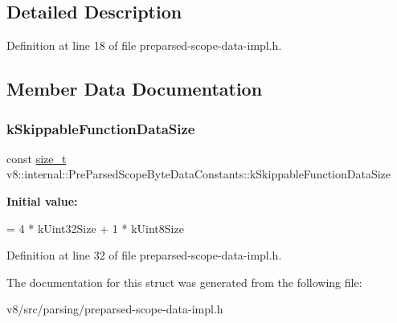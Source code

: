 \subsection{Detailed Description}


Definition at line 18 of file preparsed-\/scope-\/data-\/impl.\+h.



\subsection{Member Data Documentation}
\mbox{\label{structv8_1_1internal_1_1PreParsedScopeByteDataConstants_a93fc214dfdc6add166b5854c65a90c49}} 
\subsubsection{\texorpdfstring{k\+Skippable\+Function\+Data\+Size}{kSkippableFunctionDataSize}}
{\footnotesize\ttfamily const \mbox{\hyperlink{classsize__t}{size\+\_\+t}} v8\+::internal\+::\+Pre\+Parsed\+Scope\+Byte\+Data\+Constants\+::k\+Skippable\+Function\+Data\+Size\hspace{0.3cm}{\ttfamily [static]}}

{\bfseries Initial value\+:}
\begin{DoxyCode}
=
      4 * kUint32Size + 1 * kUint8Size
\end{DoxyCode}


Definition at line 32 of file preparsed-\/scope-\/data-\/impl.\+h.



The documentation for this struct was generated from the following file\+:\begin{DoxyCompactItemize}
\item 
v8/src/parsing/preparsed-\/scope-\/data-\/impl.\+h\end{DoxyCompactItemize}
